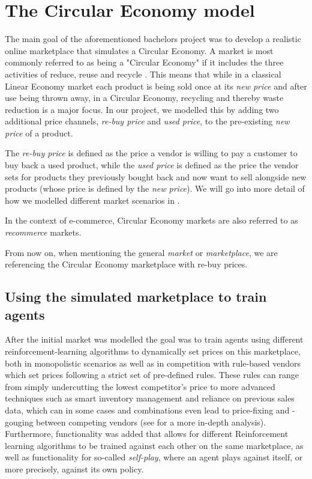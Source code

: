 \section{The Circular Economy model}\label{sec:CircularEconomy}
The main goal of the aforementioned bachelors project was to develop a realistic online marketplace that simulates a Circular Economy. A market is most commonly referred to as being a "Circular Economy" if it includes the three activities of reduce, reuse and recycle \cite{circularEconomyDefinition}. This means that while in a classical Linear Economy market each product is being sold once at its \emph{new price} and after use being thrown away, in a Circular Economy, recycling and thereby waste reduction is a major focus. In our project, we modelled this by adding two additional price channels, \emph{re-buy price} and \emph{used price}, to the pre-existing \emph{new price} of a product.

The \emph{re-buy price} is defined as the price a vendor is willing to pay a customer to buy back a used product, while the \emph{used price} is defined as the price the vendor sets for products they previously bought back and now want to sell alongside new products (whose price is defined by the \emph{new price}). We will go into more detail of how we modelled different market scenarios in .

In the context of e-commerce, Circular Economy markets are also referred to as \emph{recommerce} markets.

From now on, when mentioning the general \emph{market} or \emph{marketplace}, we are referencing the Circular Economy marketplace with re-buy prices.

\subsection{Using the simulated marketplace to train agents}\label{subsec:ReinforcementLearningIntroduction}

After the initial market was modelled the goal was to train agents using different reinforcement-learning algorithms to dynamically set prices on this marketplace, both in monopolistic scenarios as well as in competition with rule-based vendors which set prices following a strict set of pre-defined rules. These rules can range from simply undercutting the lowest competitor's price to more advanced techniques such as smart inventory management and reliance on previous sales data, which can in some cases and combinations even lead to price-fixing and -gouging between competing vendors (see  for a more in-depth analysis). Furthermore, functionality was added that allows for different Reinforcement learning algorithms to be trained against each other on the same marketplace, as well as functionality for so-called \emph{self-play}, where an agent plays against itself, or more precisely, against its own policy.

